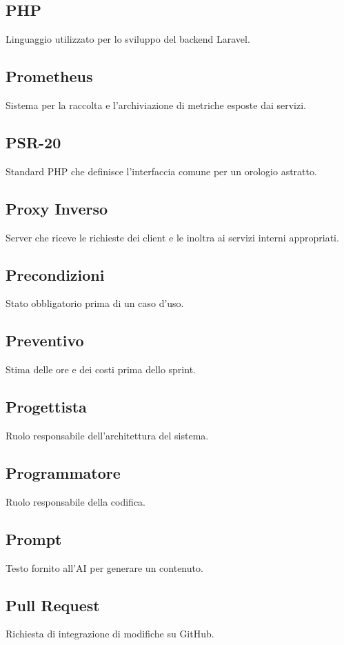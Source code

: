 \documentclass[a4paper,12pt]{article}
\begin{document}
\subsection{PHP}
Linguaggio utilizzato per lo sviluppo del backend Laravel.

\subsection{Prometheus}
Sistema per la raccolta e l'archiviazione di metriche esposte dai servizi.

\subsection{PSR-20}
Standard PHP che definisce l'interfaccia comune per un orologio astratto.

\subsection{Proxy Inverso}
Server che riceve le richieste dei client e le inoltra ai servizi interni appropriati.

\subsection{Precondizioni}
Stato obbligatorio prima di un caso d'uso.

\subsection{Preventivo}
Stima delle ore e dei costi prima dello sprint.

\subsection{Progettista}
Ruolo responsabile dell'architettura del sistema.

\subsection{Programmatore}
Ruolo responsabile della codifica.

\subsection{Prompt}
Testo fornito all'AI per generare un contenuto.

\subsection{Pull Request}
Richiesta di integrazione di modifiche su GitHub.
\end{document}

